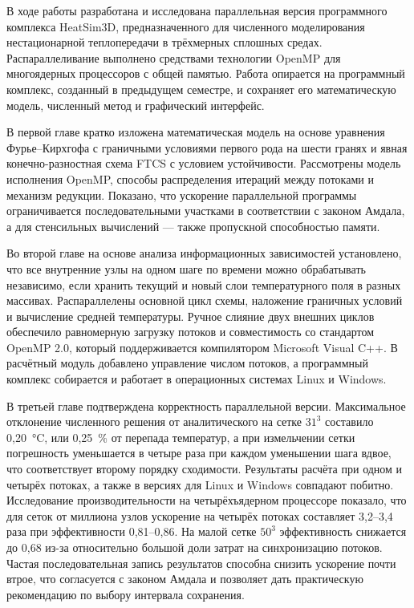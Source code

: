 \conclusion

В ходе работы разработана и исследована параллельная версия программного комплекса HeatSim3D, предназначенного для численного моделирования нестационарной теплопередачи в трёхмерных сплошных средах. Распараллеливание выполнено средствами технологии OpenMP для многоядерных процессоров с общей памятью. Работа опирается на программный комплекс, созданный в предыдущем семестре, и сохраняет его математическую модель, численный метод и графический интерфейс.

В первой главе кратко изложена математическая модель на основе уравнения Фурье--Кирхгофа с граничными условиями первого рода на шести гранях и явная конечно-разностная схема FTCS с условием устойчивости. Рассмотрены модель исполнения OpenMP, способы распределения итераций между потоками и механизм редукции. Показано, что ускорение параллельной программы ограничивается последовательными участками в соответствии с законом Амдала, а для стенсильных вычислений --- также пропускной способностью памяти.

Во второй главе на основе анализа информационных зависимостей установлено, что все внутренние узлы на одном шаге по времени можно обрабатывать независимо, если хранить текущий и новый слои температурного поля в разных массивах. Распараллелены основной цикл схемы, наложение граничных условий и вычисление средней температуры. Ручное слияние двух внешних циклов обеспечило равномерную загрузку потоков и совместимость со стандартом OpenMP 2.0, который поддерживается компилятором Microsoft Visual C++. В расчётный модуль добавлено управление числом потоков, а программный комплекс собирается и работает в операционных системах Linux и Windows.

В третьей главе подтверждена корректность параллельной версии. Максимальное отклонение численного решения от аналитического на сетке $31^3$ составило 0,20~°C, или 0,25~\% от перепада температур, а при измельчении сетки погрешность уменьшается в четыре раза при каждом уменьшении шага вдвое, что соответствует второму порядку сходимости. Результаты расчёта при одном и четырёх потоках, а также в версиях для Linux и Windows совпадают побитно. Исследование производительности на четырёхъядерном процессоре показало, что для сеток от миллиона узлов ускорение на четырёх потоках составляет 3,2--3,4 раза при эффективности 0,81--0,86. На малой сетке $50^3$ эффективность снижается до 0,68 из-за относительно большой доли затрат на синхронизацию потоков. Частая последовательная запись результатов способна снизить ускорение почти втрое, что согласуется с законом Амдала и позволяет дать практическую рекомендацию по выбору интервала сохранения.

